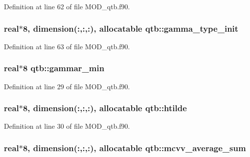 Definition at line 62 of file M\-O\-D\-\_\-qtb.\-f90.

\hypertarget{classqtb_a22c9890359a07b802b2965b97ffee55f}{
\subsubsection[{gamma\-\_\-type\-\_\-init}]{\setlength{\rightskip}{0pt plus 5cm}real$\ast$8, dimension(\-:,\-:,\-:), allocatable qtb\-::gamma\-\_\-type\-\_\-init}}\label{classqtb_a22c9890359a07b802b2965b97ffee55f}


Definition at line 63 of file M\-O\-D\-\_\-qtb.\-f90.

\hypertarget{classqtb_af53ecd68e28f6a8f53d49a5882061c03}{
\subsubsection[{gammar\-\_\-min}]{\setlength{\rightskip}{0pt plus 5cm}real$\ast$8 qtb\-::gammar\-\_\-min}}\label{classqtb_af53ecd68e28f6a8f53d49a5882061c03}


Definition at line 29 of file M\-O\-D\-\_\-qtb.\-f90.

\hypertarget{classqtb_ac36637763a01844c4f1f18d5035c9977}{
\subsubsection[{htilde}]{\setlength{\rightskip}{0pt plus 5cm}real$\ast$8, dimension(\-:,\-:,\-:), allocatable qtb\-::htilde}}\label{classqtb_ac36637763a01844c4f1f18d5035c9977}


Definition at line 30 of file M\-O\-D\-\_\-qtb.\-f90.

\hypertarget{classqtb_a476677a09383c56bbe3028b6dab3eea7}{
\subsubsection[{mcvv\-\_\-average\-\_\-sum}]{\setlength{\rightskip}{0pt plus 5cm}real$\ast$8, dimension(\-:,\-:,\-:), allocatable qtb\-::mcvv\-\_\-average\-\_\-sum}}\label{classqtb_a476677a09383c56bbe3028b6dab3eea7}


